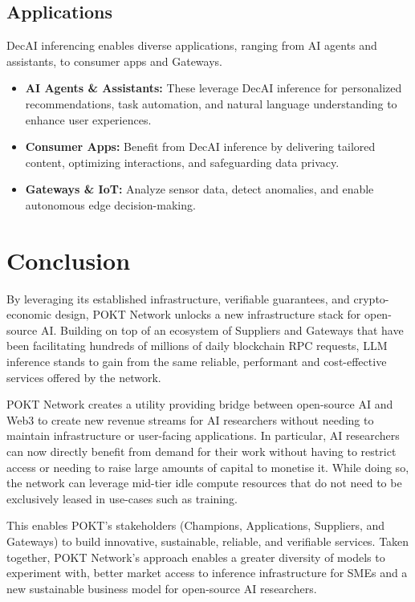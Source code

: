 \documentclass[conference,compsoc]{IEEEtran}
\begin{document}
\subsection{Applications}
DecAI inferencing enables diverse applications, ranging from AI agents and assistants, to consumer apps and Gateways.
\begin{itemize}
    \item \textbf{AI Agents \& Assistants:} These leverage DecAI inference for personalized recommendations, task automation, and natural language understanding to enhance user experiences.

    \item \textbf{Consumer Apps:} Benefit from DecAI inference by delivering tailored content, optimizing interactions, and safeguarding data privacy.

    \item \textbf{Gateways \& IoT:} Analyze sensor data, detect anomalies, and enable autonomous edge decision-making.
\end{itemize}

\section{Conclusion}
By leveraging its established infrastructure, verifiable guarantees, and crypto-economic design, POKT Network unlocks a new infrastructure stack for open-source AI. Building on top of an ecosystem of Suppliers and Gateways that have been facilitating hundreds of millions of daily blockchain RPC requests, LLM inference stands to gain from the same reliable, performant and cost-effective services offered by the network.

POKT Network creates a utility providing bridge between open-source AI and Web3 to create new revenue streams for AI researchers without needing to maintain infrastructure or user-facing applications. In particular, AI researchers can now directly benefit from demand for their work without having to restrict access or needing to raise large amounts of capital to monetise it. While doing so, the network can leverage mid-tier idle compute resources that do not need to be exclusively leased in use-cases such as training.

This enables POKT's stakeholders (Champions, Applications, Suppliers, and Gateways) to build innovative, sustainable, reliable, and verifiable services. Taken together, POKT Network’s approach enables a greater diversity of models to experiment with, better market access to inference infrastructure for SMEs and a new sustainable business model for open-source AI researchers.
\end{document}
